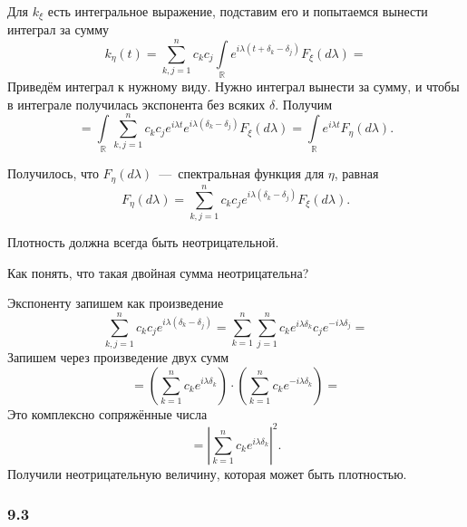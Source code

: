 Для $k_{ \xi }$ есть интегральное выражение, подставим его и попытаемся вынести интеграл за сумму
\begin{equation*}
  k_{ \eta } \left( t \right) =
  \sum \limits_{k, j = 1}^n
    c_k c_j \int \limits_{ \mathbb{R}}
      e^{i \lambda \left( t + \delta_k - \delta_j \right) } F_{ \xi } \left( d \lambda \right) =
\end{equation*}
Приведём интеграл к нужному виду.
Нужно интеграл вынести за сумму, и чтобы в интеграле получилась экспонента без всяких $ \delta $.
Получим
\begin{equation*}
  = \int \limits_{ \mathbb{R}}
      \sum \limits_{k, j = 1}^n
        c_k c_j e^{i \lambda t} e^{i \lambda \left( \delta_k - \delta_j \right) }
    F_{ \xi } \left( d \lambda \right) =
  \int \limits_{ \mathbb{R}} e^{i \lambda t} F_{ \eta } \left( d \lambda \right).
\end{equation*}

Получилось, что $F_{ \eta } \left( d \lambda \right) $~---~спектральная функция для $ \eta $, равная
\begin{equation*}
  F_{ \eta } \left( d \lambda \right) =
  \sum \limits_{k, j = 1}^n
    c_k c_j e^{i \lambda \left( \delta_k - \delta_j \right) } F_{ \xi } \left( d \lambda \right).
\end{equation*}

Плотность должна всегда быть неотрицательной.

Как понять, что такая двойная сумма неотрицательна?

Экспоненту запишем как произведение
\begin{equation*}
  \sum \limits_{k, j = 1}^n c_k c_j e^{i \lambda \left( \delta_k - \delta_j \right) } =
  \sum \limits_{k = 1}^n
    \sum \limits_{j = 1}^n c_k e^{i \lambda \delta_k} c_j e^{-i \lambda \delta_j} =
\end{equation*}
Запишем через произведение двух сумм
\begin{equation*}
  = \left( \sum \limits_{k = 1}^n c_k e^{i \lambda \delta_k} \right) \cdot
  \left( \sum \limits_{k = 1}^n c_k e^{-i \lambda \delta_k} \right) =
\end{equation*}
Это комплексно сопряжённые числа
\begin{equation*}
  = \left| \sum \limits_{k = 1}^n c_k e^{i \lambda \delta_k} \right|^2.
\end{equation*}
Получили неотрицательную величину, которая может быть плотностью.

\subsubsection*{9.3}

